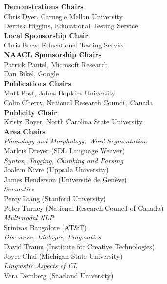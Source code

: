 {\bf Demonstrations Chairs} \\
Chris Dyer, Carnegie Mellon University \\
Derrick Higgins, Educational Testing Service \\

{\bf Local Sponsorship Chair} \\
Chris Brew, Educational Testing Service \\

{\bf NAACL Sponsorship Chairs} \\
Patrick Pantel, Microsoft Research \\
Dan Bikel, Google \\

{\bf Publications Chairs} \\
Matt Post, Johns Hopkins University \\
Colin Cherry, National Research Council, Canada \\

{\bf Publicity Chair} \\
Kristy Boyer, North Carolina State University \\

{\bf Area Chairs} \\
\emph{Phonology and Morphology, Word Segmentation} \\
Markus Dreyer (SDL Language Weaver) \\

\emph{Syntax, Tagging, Chunking and Parsing}	\\
Joakim Nivre (Uppsala University) \\
James Henderson (Université de Genève) \\

\emph{Semantics}	\\
Percy Liang (Stanford University) \\
Peter Turney (National Research Council of Canada) \\

\emph{Multimodal NLP} \\
Srinivas Bangalore (AT\&T) \\

\emph{Discourse, Dialogue, Pragmatics}	\\
David Traum (Institute for Creative Technologies) \\
Joyce Chai (Michigan State University) \\

\emph{Linguistic Aspects of CL} \\
Vera Demberg (Saarland University) \\

